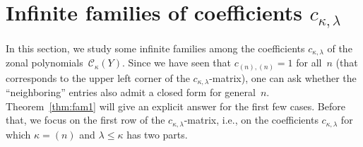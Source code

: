 \documentclass{mathincs}
\numberwithin{equation}{section}
\numberwithin{figure}{section}
\theoremstyle{plain}
\theoremstyle{definition}
\theoremstyle{remark}
\theoremstyle{plain}
\theoremstyle{definition}
\theoremstyle{plain}
\theoremstyle{plain}
\begin{document}
\section{Infinite families of coefficients $c_{\kappa,\lambda}$}
\label{sec:families}

In this section, we study some infinite families among the coefficients
$c_{\kappa,\lambda}$ of the zonal polynomials~$\mathcal{C}_{\kappa}(Y)$. Since we have
seen that $c_{(n),(n)}=1$ for all~$n$ (that corresponds to the upper left
corner of the $c_{\kappa,\lambda}$-matrix), one can ask whether the
``neighboring'' entries also admit a closed form for general~$n$.
Theorem~\ref{thm:fam1} will give an explicit answer for the first few cases.
Before that, we focus on the first row of the $c_{\kappa,\lambda}$-matrix,
i.e., on the coefficients $c_{\kappa,\lambda}$ for which
$\kappa=(n)$ and $\lambda\leq\kappa$ has two parts.
\end{document}
